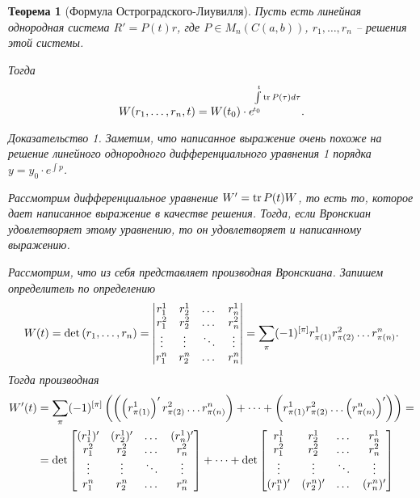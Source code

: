 \documentclass[a5paper, 10pt]{article}
\theoremstyle{definition}
\theoremstyle{plain}
\newtheorem{Th}{Теорема}
\theoremstyle{remark}
\newtheorem*{Proof}{Доказательство}
\begin{document}
	\begin{Th}[Формула Остроградского-Лиувилля]
		Пусть есть линейная однородная система $R' = P(t) r$, где $P\in M_n(C(a,b))$, $r_1, \dots, r_n$ -- решения этой системы. 
		
		Тогда \[
		W(r_1, \dots, r_n, t) = W(t_0) \cdot e^{\int\limits_{t_0}^t \operatorname{tr} P(\tau) d\tau}.
		\]
		\begin{Proof}
			Заметим, что написанное выражение очень похоже на решение линейного однородного дифференциального уравнения 1 порядка $y=y_0\cdot e^{\int p}$.
			
			Рассмотрим дифференциальное уравнение $W' = \operatorname{tr} P(t) W$, то есть то, которое дает написанное выражение в качестве решения. Тогда, если Вронскиан удовлетворяет этому уравнению, то он удовлетворяет и написанному выражению.
			
			Рассмотрим, что из себя представляет производная Вронскиана. Запишем определитель по определению
			\[
			W(t) = \det \left(r_1, \dots, r_n\right) = \begin{vmatrix}
				r_1^1 & r_2^1 & \dots & r_n^1 \\
				r_1^2 & r_2^2 & \dots & r_n^2 \\
				\vdots  & \vdots & \ddots & \vdots \\
				r_1^n & r_2^n & \dots & r_n^n \\
			\end{vmatrix} = 
			\sum\limits_\pi (-1)^{[\pi]} r_{\pi(1)}^1 r_{\pi(2)}^2 \dots r_{\pi(n)}^n. 
			\]
			Тогда производная 
			\[
			\begin{split}
			W'(t) &= 
			\sum\limits_\pi (-1)^{[\pi]} \left(\left(\left(r_{\pi(1)}^1\right)' r_{\pi(2)}^2 \dots r_{\pi(n)}^n\right) + \dots + \left(r_{\pi(1)}^1 r_{\pi(2)}^2 \dots \left(r_{\pi(n)}^n\right)'\right)\right) = \\
			&=\det \begin{bmatrix}
				(r_1^1)' & (r_2^1)' & \dots & (r_n^1)' \\
				r_1^2 & r_2^2 & \dots & r_n^2 \\
				\vdots  & \vdots & \ddots & \vdots \\
				r_1^n & r_2^n & \dots & r_n^n \\
			\end{bmatrix}+ \dots + 
	\det \begin{bmatrix}
		r_1^1 & r_2^1 & \dots & r_n^1 \\
		r_1^2 & r_2^2 & \dots & r_n^2 \\
		\vdots  & \vdots & \ddots & \vdots \\
		(r_1^n)' & (r_2^n)' & \dots & (r_n^n)' \\

\end{bmatrix}
\end{split}\]
\end{Proof}
\end{Th}
\end{document}
